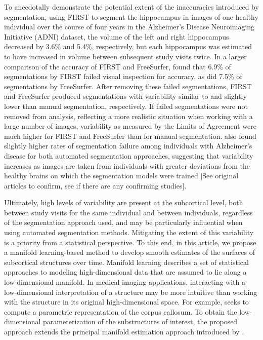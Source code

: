 \documentclass[11pt,reqno]{article}
\theoremstyle{definition}
\begin{document}
To anecdotally demonstrate the potential extent of the inaccuracies introduced by segmentation, using FIRST to segment the hippocampus in images of one healthy individual over the course of four years in the Alzheimer's Disease Neuroimaging Initiative (ADNI) dataset, the volume of the left and right hippocampus decreased by 3.6\% and 5.4\%, respectively, but each hippocampus was estimated to have increased in volume between subsequent study visits twice. In a larger comparison of the accuracy of FIRST and FreeSurfer, \cite{mulderHippocampalVolumeChange2014} found that 6.9\% of segmentations by FIRST failed visual inspection for accuracy, as did 7.5\% of segmentations by FreeSurfer. After removing these failed segmentations, FIRST and FreeSurfer produced segmentations with variability similar to and slightly lower than manual segmentation, respectively. If failed segmentations were not removed from analysis, reflecting a more realistic situation when working with a large number of images, variability as measured by the Limits of Agreement were much higher for FIRST and FreeSurfer than for manual segmentation. \cite{mulderHippocampalVolumeChange2014} also found slightly higher rates of segmentation failure among individuals with Alzheimer's disease for both automated segmentation approaches, suggesting that variability increases as images are taken from individuals with greater deviations from the healthy brains on which the segmentation models were trained [See original articles to confirm, see if there are any confirming studies].

Ultimately, high levels of variability are present at the subcortical level, both between study visits for the same individual and between individuals, regardless of the segmentation approach used, and may be particularly influential when using automated segmentation methods. Mitigating the extent of this variability is a priority from a statistical perspective. To this end, in this article, we propose a manifold learning-based method to develop smooth estimates of the surfaces of subcortical structures over time. Manifold learning describes a set of statistical approaches to modeling high-dimensional data that are assumed to lie along a low-dimensional manifold. In medical imaging applications, interacting with a low-dimensional interpretation of a structure may be more intuitive than working with the structure in its original high-dimensional space. For example, \cite{yueParameterizationWhiteMatter2016} seeks to compute a parametric representation of the corpus callosum. To obtain the low-dimensional parameterization of the substructures of interest, the proposed approach extends the principal manifold estimation approach introduced by \cite{mengPrincipalManifoldEstimation2021}.
\end{document}
